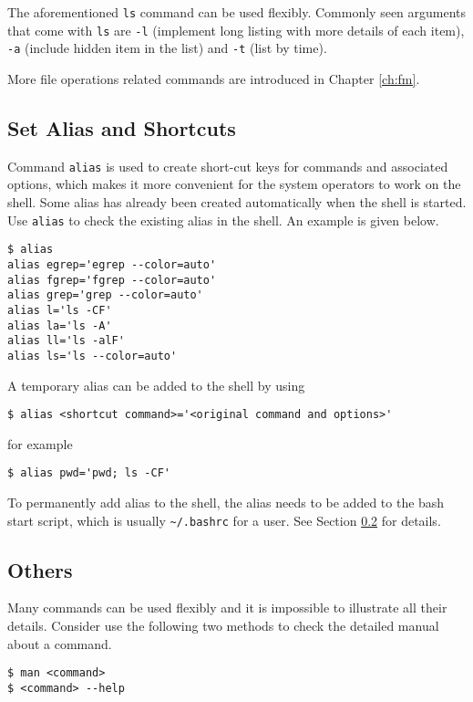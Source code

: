 The aforementioned \verb|ls| command can be used flexibly. Commonly seen arguments that come with \verb|ls| are \verb|-l| (implement long listing with more details of each item), \verb|-a| (include hidden item in the list) and \verb|-t| (list by time).

More file operations related commands are introduced in Chapter \ref{ch:fm}.

\subsection{Set Alias and Shortcuts}

Command \verb|alias| is used to create short-cut keys for commands and associated options, which makes it more convenient for the system operators to work on the shell. Some alias has already been created automatically when the shell is started. Use \verb|alias| to check the existing alias in the shell. An example is given below.

\begin{lstlisting}
$ alias
alias egrep='egrep --color=auto'
alias fgrep='fgrep --color=auto'
alias grep='grep --color=auto'
alias l='ls -CF'
alias la='ls -A'
alias ll='ls -alF'
alias ls='ls --color=auto'
\end{lstlisting}

A temporary alias can be added to the shell by using
\begin{lstlisting}
$ alias <shortcut command>='<original command and options>'
\end{lstlisting}
for example
\begin{lstlisting}
$ alias pwd='pwd; ls -CF'
\end{lstlisting}

To permanently add alias to the shell, the alias needs to be added to the bash start script, which is usually \verb|~/.bashrc| for a user. See Section \ref{ch:sb:subsec:others} for details.

\subsection{Others}\label{ch:sb:subsec:others}

Many commands can be used flexibly and it is impossible to illustrate all their details. Consider use the following two methods to check the detailed manual about a command.
\begin{lstlisting}
$ man <command>
$ <command> --help
\end{lstlisting}

